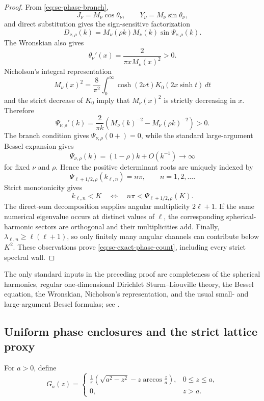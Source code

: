 \documentclass[11pt]{article}
\numberwithin{equation}{section}
\theoremstyle{definition}
\theoremstyle{remark}
\begin{document}
\begin{proof}
From \eqref{eq:sc-phase-branch},
\[
  J_\nu=M_\nu\cos\theta_\nu,
  \qquad Y_\nu=M_\nu\sin\theta_\nu,
\]
and direct substitution gives the sign-sensitive factorization
\begin{equation}
  D_{\nu,\rho}(k)
  =M_\nu(\rho k)M_\nu(k)
  \sin\Psi_{\nu,\rho}(k).
  \label{eq:sc-determinant-factorization}
\end{equation}
The Wronskian also gives
\[
  \theta_\nu'(x)=\frac2{\pi xM_\nu(x)^2}>0.
\]
Nicholson's integral representation \cite[Eq.~(10.9.30)]{DLMF}
\[
  M_\nu(x)^2=\frac8{\pi^2}\int_0^\infty
  \cosh(2\nu t)K_0(2x\sinh t)\,dt
\]
and the strict decrease of \(K_0\) imply that \(M_\nu(x)^2\) is strictly
decreasing in \(x\).  Therefore
\begin{equation}
  \Psi_{\nu,\rho}'(k)
  =\frac2{\pi k}
  \left(M_\nu(k)^{-2}-M_\nu(\rho k)^{-2}\right)>0.
  \label{eq:sc-phase-monotonicity}
\end{equation}
The branch condition gives \(\Psi_{\nu,\rho}(0+)=0\), while the standard
large-argument Bessel expansion gives
\[
  \Psi_{\nu,\rho}(k)=(1-\rho)k+O(k^{-1})\longrightarrow\infty
\]
for fixed \(\nu\) and \(\rho\).  Hence the positive determinant roots are
uniquely indexed by
\[
  \Psi_{\ell+1/2,\rho}(k_{\ell,n})=n\pi,
  \qquad n=1,2,\ldots.
\]
Strict monotonicity gives
\[
  k_{\ell,n}<K
  \quad\Longleftrightarrow\quad
  n\pi<\Psi_{\ell+1/2,\rho}(K).
\]
The direct-sum decomposition supplies angular multiplicity \(2\ell+1\).
If the same numerical eigenvalue occurs at distinct values of \(\ell\), the
corresponding spherical-harmonic sectors are orthogonal and their
multiplicities add.  Finally,
\(\lambda_{\ell,n}\ge\ell(\ell+1)\), so only finitely many angular channels
can contribute below \(K^2\).  These observations prove
\eqref{eq:sc-exact-phase-count}, including every strict spectral wall.
\end{proof}

The only standard inputs in the preceding proof are completeness of the
spherical harmonics, regular one-dimensional Dirichlet Sturm--Liouville
theory, the Bessel equation, the Wronskian, Nicholson's representation, and
the usual small- and large-argument Bessel formulas; see \cite{DLMF}.

\subsection{Uniform phase enclosures and the strict lattice proxy}

For \(a>0\), define
\begin{equation}
  G_a(z)=
  \begin{cases}
  \displaystyle\frac1\pi\left(\sqrt{a^2-z^2}
  -z\arccos\frac za\right),&0\le z\le a,\\[1mm]
  0,&z>a.
  \end{cases}
  \label{eq:sc-model-action}
\end{equation}
\end{document}
